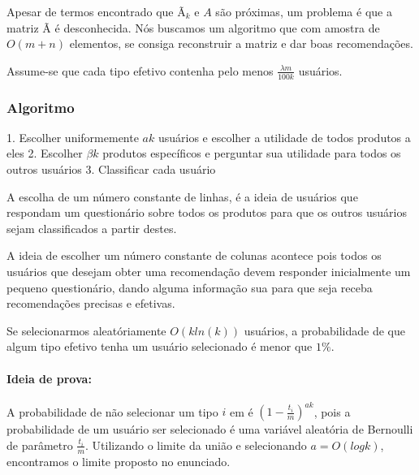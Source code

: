 \documentclass[a4paper,10pt]{article}
\begin{document}
Apesar de termos encontrado que Ã$_k$ e $A$ são próximas, um problema é que a matriz Ã é desconhecida. Nós buscamos um algoritmo que com amostra de $O(m+n)$ elementos, se consiga reconstruir a matriz e dar boas recomendações. 

Assume-se que cada tipo efetivo contenha pelo menos $\frac{\lambda m}{100k}$ usuários.

\subsubsection{Algoritmo}

1. Escolher uniformemente $ak$ usuários e escolher a utilidade de todos produtos a eles
2. Escolher $\beta k$ produtos específicos e perguntar sua utilidade para todos os outros usuários
3. Classificar cada usuário

A escolha de um número constante de linhas, é a ideia de usuários que respondam um questionário sobre todos os produtos para que os outros usuários sejam
classificados a partir destes. 

A ideia de escolher um número constante de colunas acontece pois todos os usuários que desejam obter uma recomendação devem responder inicialmente um pequeno 
questionário, dando alguma informação sua para que seja receba recomendações precisas e efetivas.


\begin{lema}
 Se selecionarmos aleatóriamente $O(k ln (k) )$ usuários, a probabilidade de que algum tipo efetivo tenha um usuário selecionado é menor que $1\%$.
\end{lema}

\paragraph{Ideia de prova:} 
A probabilidade de não selecionar um tipo $i$ em é $(1 - \frac{t_i}{m})^{ak}$, pois a probabilidade de um usuário ser selecionado é uma variável
aleatória de Bernoulli de parâmetro $\frac{t_i}{m}$. Utilizando o limite da união e selecionando $a = O(log k)$, encontramos o limite proposto no enunciado.




\end{document}
